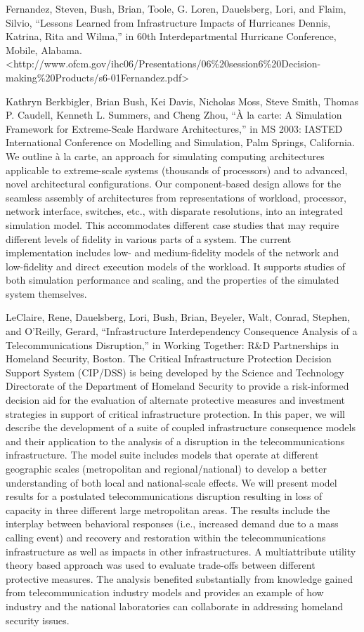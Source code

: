 \documentclass[]{article}
\begin{document}
Fernandez, Steven, Bush, Brian, Toole, G. Loren, Dauelsberg, Lori, and
Flaim, Silvio, ``Lessons Learned from Infrastructure Impacts of
Hurricanes Dennis, Katrina, Rita and Wilma,'' in 60th Interdepartmental
Hurricane Conference, Mobile, Alabama.
\textless{}http://www.ofcm.gov/ihc06/Presentations/06\%20session6\%20Decision-making\%20Products/s6-01Fernandez.pdf\textgreater{}

Kathryn Berkbigler, Brian Bush, Kei Davis, Nicholas Moss, Steve Smith,
Thomas P. Caudell, Kenneth L. Summers, and Cheng Zhou, ``À la carte: A
Simulation Framework for Extreme-Scale Hardware Architectures,'' in MS
2003: IASTED International Conference on Modelling and Simulation, Palm
Springs, California. We outline à la carte, an approach for simulating
computing architectures applicable to extreme-scale systems (thousands
of processors) and to advanced, novel architectural configurations. Our
component-based design allows for the seamless assembly of architectures
from representations of workload, processor, network interface,
switches, etc., with disparate resolutions, into an integrated
simulation model. This accommodates different case studies that may
require different levels of fidelity in various parts of a system. The
current implementation includes low- and medium-fidelity models of the
network and low-fidelity and direct execution models of the workload. It
supports studies of both simulation performance and scaling, and the
properties of the simulated system themselves.

LeClaire, Rene, Dauelsberg, Lori, Bush, Brian, Beyeler, Walt, Conrad,
Stephen, and O'Reilly, Gerard, ``Infrastructure Interdependency
Consequence Analysis of a Telecommunications Disruption,'' in Working
Together: R\&D Partnerships in Homeland Security, Boston. The Critical
Infrastructure Protection Decision Support System (CIP/DSS) is being
developed by the Science and Technology Directorate of the Department of
Homeland Security to provide a risk-informed decision aid for the
evaluation of alternate protective measures and investment strategies in
support of critical infrastructure protection. In this paper, we will
describe the development of a suite of coupled infrastructure
consequence models and their application to the analysis of a disruption
in the telecommunications infrastructure. The model suite includes
models that operate at different geographic scales (metropolitan and
regional/national) to develop a better understanding of both local and
national-scale effects. We will present model results for a postulated
telecommunications disruption resulting in loss of capacity in three
different large metropolitan areas. The results include the interplay
between behavioral responses (i.e., increased demand due to a mass
calling event) and recovery and restoration within the
telecommunications infrastructure as well as impacts in other
infrastructures. A multiattribute utility theory based approach was used
to evaluate trade-offs between different protective measures. The
analysis benefited substantially from knowledge gained from
telecommunication industry models and provides an example of how
industry and the national laboratories can collaborate in addressing
homeland security issues.
\end{document}
